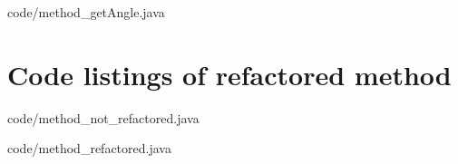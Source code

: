 \documentclass[conference]{IEEEtran}
\begin{document}

{code/method_getAngle.java}

\section{Code listings of refactored method}

{code/method_not_refactored.java}	


{code/method_refactored.java}
\end{document}
